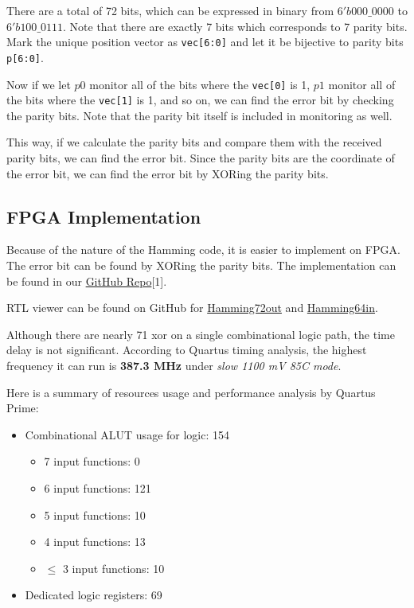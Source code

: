 \documentclass[conference]{IEEEtran}
\begin{document}
There are a total of 72 bits, which can be expressed in binary from
$6'b000\_0000$ to $6'b 100\_0111$. Note that there are exactly 7 bits which
corresponds to 7 parity bits. Mark the unique position vector as
\texttt{vec[6:0]} and let it be bijective to parity bits \texttt{p[6:0]}.

Now if we let $p0$ monitor all of the bits where the \texttt{vec[0]} is 1, $p1$
monitor all of the bits where the \texttt{vec[1]} is 1, and so on, we can find
the error bit by checking the parity bits. Note that the parity bit itself is
included in monitoring as well.

This way, if we calculate the parity bits and compare them with the received
parity bits, we can find the error bit. Since the parity bits are the
coordinate of the error bit, we can find the error bit by XORing the parity
bits.

\subsection{FPGA Implementation}
Because of the nature of the Hamming code, it is easier to implement on FPGA.
The error bit can be found by XORing the parity bits. The implementation can be
found in our \href{https://github.com/luckunately/ELEC433-Projects}{GitHub
  Repo}[1].

  RTL viewer can be found on GitHub for \href{https://github.com/luckunately/ELEC433-Projects/blob/add-tex/Hamming72out/Hamming72out_RTL.pdf}{Hamming72out} and \href{https://github.com/luckunately/ELEC433-Projects/blob/add-tex/Hamming64in/Hamming64inRTL.pdf}{Hamming64in}.

Although there are nearly 71 xor on a single combinational logic path, the time
delay is not significant. According to Quartus timing analysis, the highest
frequency it can run is \textbf{387.3 MHz} under \textit{slow 1100 mV 85C
  mode}.

Here is a summary of resources usage and performance analysis by Quartus Prime:
\begin{itemize}
  \item Combinational ALUT usage for logic: 154
  \begin{itemize}
    \item 7 input functions: 0
    \item 6 input functions: 121
    \item 5 input functions: 10
    \item 4 input functions: 13
    \item $\leq$ 3 input functions: 10
  \end{itemize}
  \item Dedicated logic registers: 69
\end{itemize}
\end{document}
